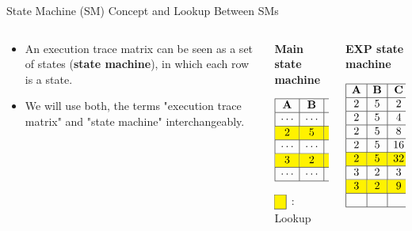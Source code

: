 \begin{frame}{State Machine (SM) Concept and Lookup Between SMs}
\begin{columns}
\begin{column}{0.35\textwidth}
\begin{itemize}
\item An execution trace matrix can be seen as a
set of states (\textbf{state machine}), in which
each row is a state.
\item We will use both, the terms "execution trace matrix" and "state machine" interchangeably.
\end{itemize}
\end{column}
\begin{column}{0.3\textwidth}
\textbf{Main state machine} \centering

\vspace{-0.7cm}
$$ \begin{array}{|c|c|c|c|}
\hline
\textbf{A} &  \textbf{B} & \textbf{C} &  \textbf{EXP}\\
\hline
\cdots & \cdots & \cdots & 0 \\ \hline
2  \cellcolor{yellow} & 5 \cellcolor{yellow} &
32 \cellcolor{yellow} & 1 \cellcolor{yellow} \\
\hline
\cdots & \cdots & \cdots & \cdots \\ \hline
3  \cellcolor{yellow} & 2 \cellcolor{yellow} & 9
\cellcolor{yellow} & 1 \cellcolor{yellow} \\ \hline
\cdots & \cdots & \cdots & 0 \\ \hline
\end{array} $$
\begin{flushleft} \hspace{0.6cm}
$ \begin{array}{|c|}
  \hline \cellcolor{yellow} \\ \hline
\end{array}$
: Lookup
\end{flushleft}
\end{column}
\begin{column}{0.3\textwidth}
\textbf{EXP state machine} \centering

\vspace{-0.7cm}
$$\begin{array}{|c|c|c|c|c|}
\hline
\textbf{A} & \textbf{B} & \textbf{C} & \textbf{D}
& \textbf{EXP} \\ \hline
2 & 5 & 2 & 5 & 0 \\ \hline
2 & 5 & 4 & 4 & 0 \\ \hline
2 & 5 & 8 & 3 & 0 \\ \hline
2 & 5 & 16 & 2 & 0 \\ \hline
2 \cellcolor{yellow} & 5 \cellcolor{yellow} &
32 \cellcolor{yellow} & 1 & 1
\cellcolor{yellow}\\ \hline
3 & 2 & 3 & 2 & 0 \\ \hline
3 \cellcolor{yellow} & 2 \cellcolor{yellow} & 9
\cellcolor{yellow} & 1 & 1 \cellcolor{yellow} \\ \hline
& & & & \\ \hline
\end{array} $$
\end{column}
\end{columns}


\end{frame}
